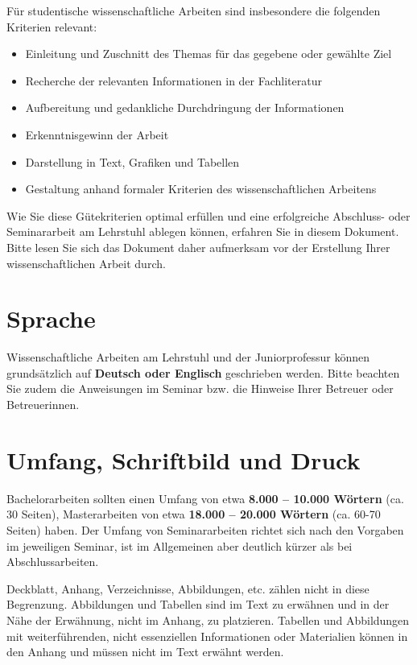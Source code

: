 \documentclass[
  letterpaper,
  DIV=11]{scrreprt}
\begin{document}
Für studentische wissenschaftliche Arbeiten sind insbesondere die
folgenden Kriterien relevant:

\begin{itemize}
\item
  Einleitung und Zuschnitt des Themas für das gegebene oder gewählte
  Ziel
\item
  Recherche der relevanten Informationen in der Fachliteratur
\item
  Aufbereitung und gedankliche Durchdringung der Informationen
\item
  Erkenntnisgewinn der Arbeit
\item
  Darstellung in Text, Grafiken und Tabellen
\item
  Gestaltung anhand formaler Kriterien des wissenschaftlichen Arbeitens
\end{itemize}

Wie Sie diese Gütekriterien optimal erfüllen und eine erfolgreiche
Abschluss- oder Seminararbeit am Lehrstuhl ablegen können, erfahren Sie
in diesem Dokument. Bitte lesen Sie sich das Dokument daher aufmerksam
vor der Erstellung Ihrer wissenschaftlichen Arbeit durch.

\section{Sprache}\label{sprache}

Wissenschaftliche Arbeiten am Lehrstuhl und der Juniorprofessur können
grundsätzlich auf \textbf{Deutsch oder Englisch} geschrieben werden.
Bitte beachten Sie zudem die Anweisungen im Seminar bzw. die Hinweise
Ihrer Betreuer oder Betreuerinnen.

\section{Umfang, Schriftbild und
Druck}\label{umfang-schriftbild-und-druck}

Bachelorarbeiten sollten einen Umfang von etwa \textbf{8.000 -- 10.000
Wörtern} (ca. 30 Seiten), Masterarbeiten von etwa \textbf{18.000 --
20.000 Wörtern} (ca. 60-70 Seiten) haben. Der Umfang von Seminararbeiten
richtet sich nach den Vorgaben im jeweiligen Seminar, ist im Allgemeinen
aber deutlich kürzer als bei Abschlussarbeiten.

Deckblatt, Anhang, Verzeichnisse, Abbildungen, etc. zählen nicht in
diese Begrenzung. Abbildungen und Tabellen sind im Text zu erwähnen und
in der Nähe der Erwähnung, nicht im Anhang, zu platzieren. Tabellen und
Abbildungen mit weiterführenden, nicht essenziellen Informationen oder
Materialien können in den Anhang und müssen nicht im Text erwähnt
werden.
\end{document}
